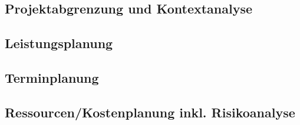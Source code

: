 \documentclass{article}
\begin{document}
	\subsection{Projektabgrenzung und Kontextanalyse}
	\subsection{Leistungsplanung}
	\subsection{Terminplanung}
	\subsection{Ressourcen/Kostenplanung inkl. Risikoanalyse}
	























  
\end{document}
